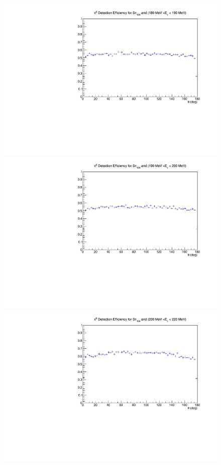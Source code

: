 \begin{figure}[H]
\begin{center}
\includegraphics[scale=0.4]{pictures/pdf/pi0_efficiency_Sn124_Ebin6.pdf}
\includegraphics[scale=0.4]{pictures/pdf/pi0_efficiency_Sn124_Ebin7.pdf}
\includegraphics[scale=0.4]{pictures/pdf/pi0_efficiency_Sn124_Ebin8.pdf}

\end{center}
\end{figure}
